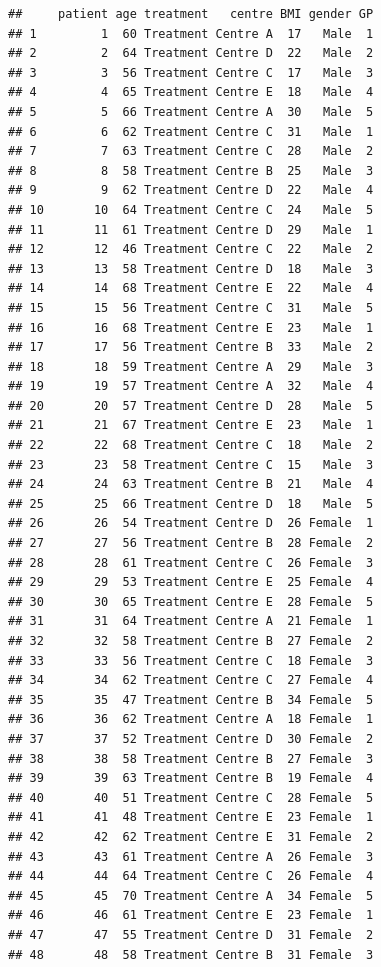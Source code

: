 \documentclass[]{article}
\begin{document}
\begin{verbatim}
##     patient age treatment   centre BMI gender GP
## 1         1  60 Treatment Centre A  17   Male  1
## 2         2  64 Treatment Centre D  22   Male  2
## 3         3  56 Treatment Centre C  17   Male  3
## 4         4  65 Treatment Centre E  18   Male  4
## 5         5  66 Treatment Centre A  30   Male  5
## 6         6  62 Treatment Centre C  31   Male  1
## 7         7  63 Treatment Centre C  28   Male  2
## 8         8  58 Treatment Centre B  25   Male  3
## 9         9  62 Treatment Centre D  22   Male  4
## 10       10  64 Treatment Centre C  24   Male  5
## 11       11  61 Treatment Centre D  29   Male  1
## 12       12  46 Treatment Centre C  22   Male  2
## 13       13  58 Treatment Centre D  18   Male  3
## 14       14  68 Treatment Centre E  22   Male  4
## 15       15  56 Treatment Centre C  31   Male  5
## 16       16  68 Treatment Centre E  23   Male  1
## 17       17  56 Treatment Centre B  33   Male  2
## 18       18  59 Treatment Centre A  29   Male  3
## 19       19  57 Treatment Centre A  32   Male  4
## 20       20  57 Treatment Centre D  28   Male  5
## 21       21  67 Treatment Centre E  23   Male  1
## 22       22  68 Treatment Centre C  18   Male  2
## 23       23  58 Treatment Centre C  15   Male  3
## 24       24  63 Treatment Centre B  21   Male  4
## 25       25  66 Treatment Centre D  18   Male  5
## 26       26  54 Treatment Centre D  26 Female  1
## 27       27  56 Treatment Centre B  28 Female  2
## 28       28  61 Treatment Centre C  26 Female  3
## 29       29  53 Treatment Centre E  25 Female  4
## 30       30  65 Treatment Centre E  28 Female  5
## 31       31  64 Treatment Centre A  21 Female  1
## 32       32  58 Treatment Centre B  27 Female  2
## 33       33  56 Treatment Centre C  18 Female  3
## 34       34  62 Treatment Centre C  27 Female  4
## 35       35  47 Treatment Centre B  34 Female  5
## 36       36  62 Treatment Centre A  18 Female  1
## 37       37  52 Treatment Centre D  30 Female  2
## 38       38  58 Treatment Centre B  27 Female  3
## 39       39  63 Treatment Centre B  19 Female  4
## 40       40  51 Treatment Centre C  28 Female  5
## 41       41  48 Treatment Centre E  23 Female  1
## 42       42  62 Treatment Centre E  31 Female  2
## 43       43  61 Treatment Centre A  26 Female  3
## 44       44  64 Treatment Centre C  26 Female  4
## 45       45  70 Treatment Centre A  34 Female  5
## 46       46  61 Treatment Centre E  23 Female  1
## 47       47  55 Treatment Centre D  31 Female  2
## 48       48  58 Treatment Centre B  31 Female  3

\end{verbatim}
\end{document}
